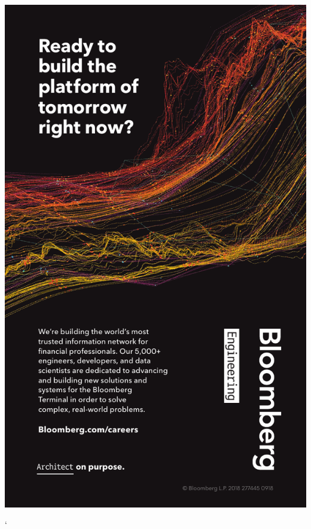 \thispagestyle{empty}
\begin{center}
  \vfill
  \includegraphics[width=\textwidth]{content/ads/full/bloomberg.pdf}
  \vfill
\end{center}
\clearpage
`
\thispagestyle{empty}
